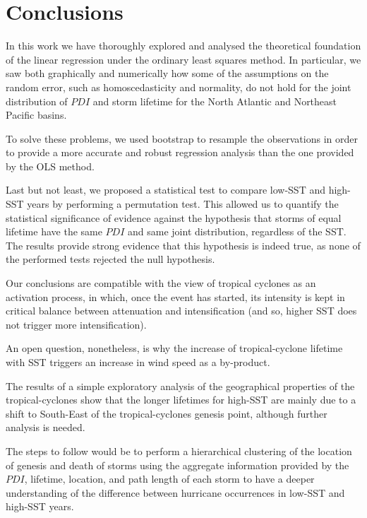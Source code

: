 \section{Conclusions}
In this work we have thoroughly explored and analysed the theoretical foundation of the linear regression under the ordinary least squares method. In particular, we saw both graphically and numerically how some of the assumptions on the random error, such as homoscedasticity and normality, do not hold for the joint distribution of $PDI$ and storm lifetime for the North Atlantic and Northeast Pacific basins.

To solve these problems, we used bootstrap to resample the observations in order to provide a more accurate and robust regression analysis than the one provided by the OLS method.

Last but not least, we proposed a statistical test to compare low-SST and high-SST years by performing a permutation test. This allowed us to quantify the statistical significance of evidence against the hypothesis that storms of equal lifetime have the same $PDI$ and same joint distribution, regardless of the SST. The results provide strong evidence that this hypothesis is indeed true, as none of the performed tests rejected the null hypothesis.

Our conclusions are compatible with the view of tropical cyclones as an activation process, in which, once the event has started, its intensity is kept in critical balance between attenuation and intensification (and so, higher SST does not trigger more intensification).

\bigskip
An open question, nonetheless, is why the increase of tropical-cyclone lifetime with SST triggers an increase in wind speed as a by-product.

The results of a simple exploratory analysis of the geographical properties of the tropical-cyclones show that the longer lifetimes for high-SST are mainly due to a shift to South-East of the tropical-cyclones genesis point, although further analysis is needed.

The steps to follow would be to perform a hierarchical clustering of the location of genesis and death of storms using the aggregate information provided by the $PDI$, lifetime, location, and path length of each storm to have a deeper understanding of the difference between hurricane occurrences in low-SST and high-SST years.
